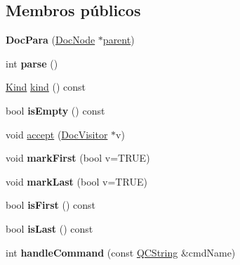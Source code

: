 \subsection*{Membros públicos}
\begin{DoxyCompactItemize}
\item 
\hypertarget{class_doc_para_af998526b3607cfff282fe4ec1cdd89dc}{{\bfseries Doc\-Para} (\hyperlink{class_doc_node}{Doc\-Node} $\ast$\hyperlink{class_doc_node_abd7f070d6b0a38b4da71c2806578d19d}{parent})}\label{class_doc_para_af998526b3607cfff282fe4ec1cdd89dc}

\item 
\hypertarget{class_doc_para_a67007fc2be130666fbf3b065022756f4}{int {\bfseries parse} ()}\label{class_doc_para_a67007fc2be130666fbf3b065022756f4}

\item 
\hyperlink{class_doc_node_aa10c9e8951b8ccf714a59ec321bdac5b}{Kind} \hyperlink{class_doc_para_aa9d037bed9f9a083d0cd01485637d843}{kind} () const 
\item 
\hypertarget{class_doc_para_a479432127ee77145cc19d6a2d1590821}{bool {\bfseries is\-Empty} () const }\label{class_doc_para_a479432127ee77145cc19d6a2d1590821}

\item 
void \hyperlink{class_doc_para_a7ba716e854ae2f8f87a4eb2140e302b6}{accept} (\hyperlink{class_doc_visitor}{Doc\-Visitor} $\ast$v)
\item 
\hypertarget{class_doc_para_a7d3af17d92bf948006d448691283290c}{void {\bfseries mark\-First} (bool v=T\-R\-U\-E)}\label{class_doc_para_a7d3af17d92bf948006d448691283290c}

\item 
\hypertarget{class_doc_para_a9d9fd09f1f4baa960c94af1d41c60f95}{void {\bfseries mark\-Last} (bool v=T\-R\-U\-E)}\label{class_doc_para_a9d9fd09f1f4baa960c94af1d41c60f95}

\item 
\hypertarget{class_doc_para_af018468130393cdae58e14a36980f94c}{bool {\bfseries is\-First} () const }\label{class_doc_para_af018468130393cdae58e14a36980f94c}

\item 
\hypertarget{class_doc_para_a8dad52a23ff99a58cb64461598a11d5c}{bool {\bfseries is\-Last} () const }\label{class_doc_para_a8dad52a23ff99a58cb64461598a11d5c}

\item 
\hypertarget{class_doc_para_a916eeb692e39b5bf5a6c372aa4e2f408}{int {\bfseries handle\-Command} (const \hyperlink{class_q_c_string}{Q\-C\-String} \&cmd\-Name)}\label{class_doc_para_a916eeb692e39b5bf5a6c372aa4e2f408}


\end{DoxyCompactItemize}

